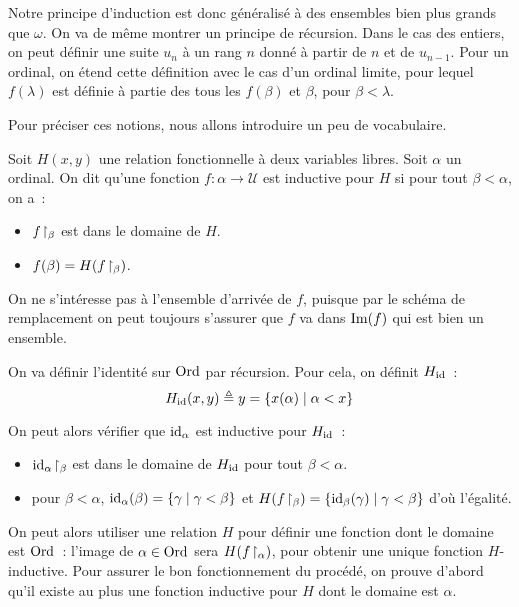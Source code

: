 Notre principe d'induction est donc généralisé à des ensembles bien plus grands
que $\omega$. On va de même montrer un principe de récursion. Dans le cas des
entiers, on peut définir une suite $u_n$ à un rang $n$ donné à partir de $n$ et
de $u_{n-1}$. Pour un ordinal, on étend cette définition avec le cas d'un
ordinal limite, pour lequel $f(\lambda)$ est définie à partie des tous les
$f(\beta)$ et $\beta$, pour $\beta < \lambda$.

Pour préciser ces notions, nous allons introduire un peu de vocabulaire.

\begin{definition}
  Soit $H(x,y)$ une relation fonctionnelle à deux variables libres. Soit
  $\alpha$ un ordinal. On dit qu'une fonction $f : \alpha \to \mathcal U$ est
  inductive pour $H$ si pour tout $\beta < \alpha$, on a~:
  \begin{itemize}
  \item $f\!\upharpoonright_{\beta}$ est dans le domaine de $H$.
  \item $f(\beta) = H(f\!\upharpoonright_{\beta})$.
  \end{itemize}
\end{definition}

\begin{remark}
  On ne s'intéresse pas à l'ensemble d'arrivée de $f$, puisque par le schéma de
  remplacement on peut toujours s'assurer que $f$ va dans $\operatorname{Im}(f)$ qui est bien
  un ensemble.
\end{remark}

\begin{example}
  On va définir l'identité sur $\operatorname{Ord}$ par récursion. Pour cela, on définit
  $H_{\operatorname{id}}$~:
  \[H_{\operatorname{id}}(x,y) \triangleq y = \{x(\alpha) \mid \alpha < x\}\]

  On peut alors vérifier que $\operatorname{id}_\alpha$ est inductive pour $H_{\operatorname{id}}$~:
  \begin{itemize}
  \item $\operatorname{id}_{\alpha}\!\upharpoonright_{\beta}$ est dans le domaine de $H_{\operatorname{id}}$ pour tout
    $\beta < \alpha$.
  \item pour $\beta < \alpha$,
    $\operatorname{id}_\alpha(\beta) = \{\gamma\mid \gamma < \beta\}$ et
    $H(f\!\upharpoonright_{\beta}) = \{\operatorname{id}_\beta(\gamma)\mid \gamma < \beta\}$ d'où
    l'égalité.
  \end{itemize}
\end{example}

On peut alors utiliser une relation $H$ pour définir une fonction dont le
domaine est $\operatorname{Ord}$~: l'image de $\alpha\in\operatorname{Ord}$ sera $H(f\!\upharpoonright_{\alpha})$, pour
obtenir une unique fonction $H$-inductive. Pour assurer le bon fonctionnement
du procédé, on prouve d'abord qu'il existe au plus une fonction inductive pour
$H$ dont le domaine est $\alpha$.

